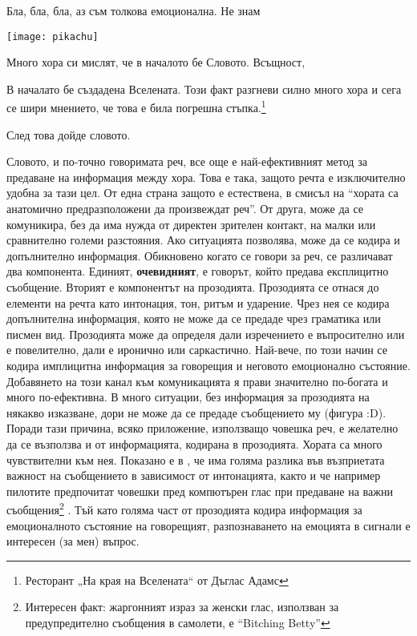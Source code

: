 \documentclass[main.tex]{subfiles}
\begin{document}
Бла, бла, бла, аз съм толкова емоционална. 
Не знам

\texttt{[image: pikachu]}

Много хора си мислят, че в началото бе Словото. Всъщност, 
\begin{displayquote}
    В началато бе създадена Вселената. Този факт разгневи силно много хора и сега се шири мнението, че това е била погрешна стъпка.\footnote{Ресторант „На края на Вселената“ от Дъглас Адамс}
\end{displayquote}
    
След това дойде словото.

Словото, и по-точно говоримата реч, все още е най-ефективният метод за предаване на информация между хора. Това е така, защото речта е изключително удобна за тази цел. От една страна защото е естествена, в смисъл на ``хората са анатомично предразположени да произвеждат реч''. От друга, може да се комуникира, без да има нужда от директен зрителен контакт, на малки или сравнително големи разстояния. Ако ситуацията позволява, може да се кодира и допълнително информация. Обикновено когато се говори за реч, се различават два компонента. Единият, \textbf{очевидният}, е говорът, който предава експлицитно съобщение. Вторият е компонентът на прозодията. Прозодията се отнася до елементи на речта като интонация, тон, ритъм и ударение. Чрез нея се кодира допълнителна информация, която не може да се предаде чрез граматика или писмен вид. Прозодията може да определя дали изречението е въпросително или е повелително, дали е иронично или саркастично. Най-вече, по този начин се кодира имплицитна информация за говорещия и неговото емоционално състояние. Добавянето на този канал към комуникацията я прави значително по-богата и много по-ефективна. В много ситуации, без информация за прозодията на някакво изказване, дори не може да се предаде съобщението му (фигура :D). Поради тази причина, всяко приложение, използващо човешка реч, е желателно да се възползва и от информацията, кодирана в прозодията. Хората са много чувствителни към нея. Показано е в \cite{urgency}, че има голяма разлика във възприетата важност на съобщението в зависимост от интонацията, както и че например пилотите предпочитат човешки пред компютърен глас при предаване на важни съобщения\footnote{Интересен факт: жаргонният израз за женски глас, използван за предупредително съобщения в самолети, е ``Bitching Betty''} \cite{cockpit}. Тъй като голяма част от прозодията кодира информация за емоционалното състояние на говорещият, разпознаването на емоцията в сигнали е интересен (за мен) въпрос.
\end{document}
